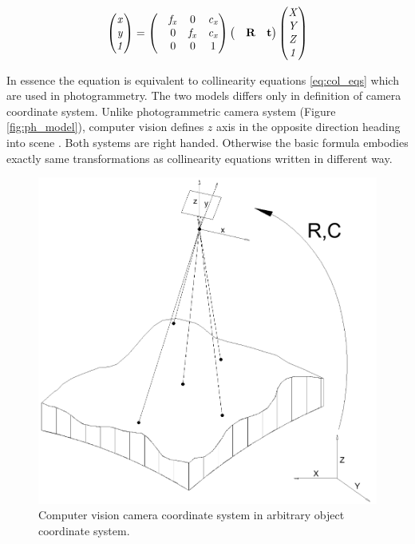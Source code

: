 \documentclass[a4paper,12pt]{article}
\newcommand{\ematr}[1]{
{\bf #1}
}
\newcommand{\evect}[1]{
{\bf #1}
}
\newcommand{\escal}[1]{
{\it #1}
}
\begin{document}
\begin{equation}
\begin{pmatrix}
   \escal{x} \\
   \escal{y} \\
   \escal{1} \\
\end{pmatrix}
=
\begin{pmatrix}
   & \escal{f_{x}} & 0     & \escal{c_{x}}\\
   & 0     & \escal{f_{x}} & \escal{c_{x}}\\
   & 0     & 0     & 1\\
\end{pmatrix}
\begin{pmatrix}
&\ematr{R}&\evect{t}\\
\end{pmatrix}
\begin{pmatrix}
   \escal{X} \\
   \escal{Y} \\
   \escal{Z} \\
   \escal{1} \\
\end{pmatrix}
\end{equation}

In essence the equation is equivalent to collinearity equations \eqref{eq:col_eqs} which are used in photogrammetry.
The two models differs only in definition of camera coordinate system.
Unlike photogrammetric camera system (Figure \ref{fig:ph_model}), computer vision defines $z$ axis in the opposite direction heading into scene \cite[p. 156]{Hartley2004}.
Both systems are right handed.
Otherwise the basic formula embodies exactly same transformations as collinearity equations written in different way.

\begin{figure}[h]
    \centering
    \includegraphics[scale=0.3]{figures/photogrammetric_model.png}
    \caption{Computer vision camera coordinate system in arbitrary object coordinate system.}
    \label{fig:cv_model}
\end{figure}
\end{document}
